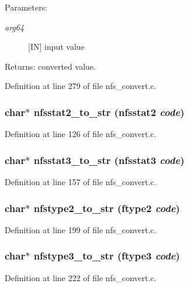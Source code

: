 \begin{Desc}
\item[Parameters:]
\begin{description}
\item[{\em arg64}][IN] input value\end{description}
\end{Desc}
\begin{Desc}
\item[Returns:]converted value. \end{Desc}


Definition at line 279 of file nfs\_\-convert.c.
\subsubsection[{nfsstat2\_\-to\_\-str}]{\setlength{\rightskip}{0pt plus 5cm}char$\ast$ nfsstat2\_\-to\_\-str (nfsstat2 {\em code})}\label{nfs__convert_8c_fe1a009aa12e4010f72e91e34c0b69be}




Definition at line 126 of file nfs\_\-convert.c.
\subsubsection[{nfsstat3\_\-to\_\-str}]{\setlength{\rightskip}{0pt plus 5cm}char$\ast$ nfsstat3\_\-to\_\-str (nfsstat3 {\em code})}\label{nfs__convert_8c_2e00e2efee8b1a0234dfcfa69126094e}




Definition at line 157 of file nfs\_\-convert.c.
\subsubsection[{nfstype2\_\-to\_\-str}]{\setlength{\rightskip}{0pt plus 5cm}char$\ast$ nfstype2\_\-to\_\-str (ftype2 {\em code})}\label{nfs__convert_8c_cd481d151104f463a8fa777a96b85ecd}




Definition at line 199 of file nfs\_\-convert.c.
\subsubsection[{nfstype3\_\-to\_\-str}]{\setlength{\rightskip}{0pt plus 5cm}char$\ast$ nfstype3\_\-to\_\-str (ftype3 {\em code})}\label{nfs__convert_8c_9d4214ccfda180f881344e77ce947fe0}




Definition at line 222 of file nfs\_\-convert.c.